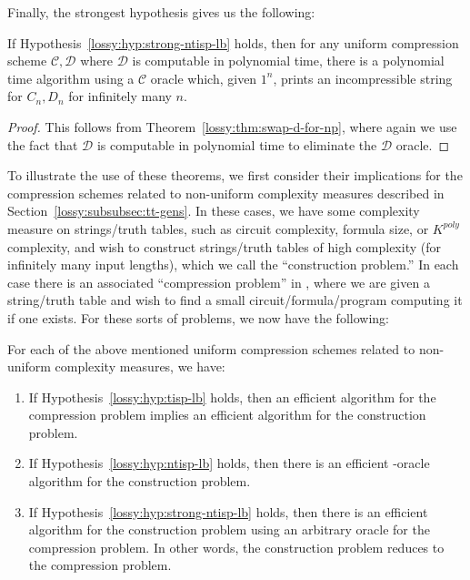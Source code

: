 Finally, the strongest hypothesis gives us the following:
\begin{theorem}\label{lossy:thm:swap-d-impl}
If Hypothesis~\ref{lossy:hyp:strong-ntisp-lb} holds, then for any uniform compression scheme $\mathcal{C},\mathcal{D}$ where $\mathcal{D}$ is computable in polynomial time, there is a polynomial time algorithm using a $\mathcal{C}$ oracle which, given $1^n$, prints an incompressible string for $C_n,D_n$ for infinitely many $n$.
\end{theorem}
\begin{proof}
This follows from Theorem~\ref{lossy:thm:swap-d-for-np}, where again we use the fact that $\mathcal{D}$ is computable in polynomial time to eliminate the $\mathcal{D}$ oracle.
\end{proof}

To illustrate the use of these theorems, we first consider their implications for the compression schemes related to non-uniform complexity measures described in Section~\ref{lossy:subsubsec:tt-gens}. In these cases, we have some complexity measure on strings/truth tables, such as circuit complexity, formula size, or $K^{poly}$ complexity, and wish to construct strings/truth tables of high complexity (for infinitely many input lengths), which we call the ``construction problem.'' In each case there is an associated ``compression problem'' in , where we are given a string/truth table and wish to find a small circuit/formula/program computing it if one exists. For these sorts of problems, we now have the following:
\begin{corollary}\label{lossy:cor:main-impls}
For each of the above mentioned uniform compression schemes related to non-uniform complexity measures, we have:
\begin{enumerate}
    \item If Hypothesis~\ref{lossy:hyp:tisp-lb} holds, then an efficient algorithm for the compression problem implies an efficient algorithm for the construction problem.
    \item If Hypothesis~\ref{lossy:hyp:ntisp-lb} holds, then there is an efficient -oracle algorithm for the construction problem.
    \item If Hypothesis~\ref{lossy:hyp:strong-ntisp-lb} holds, then there is an efficient algorithm for the construction problem using an arbitrary oracle for the compression problem. In other words, the construction problem reduces to the compression problem.
\end{enumerate}
\end{corollary}
